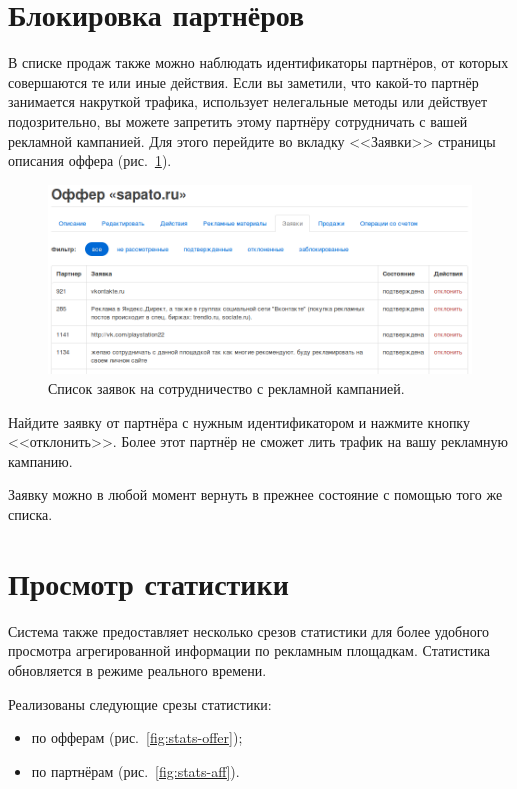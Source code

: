\documentclass[a4paper,12pt]{article}
\begin{document}
\section{Блокировка партнёров}

В списке продаж также можно наблюдать идентификаторы партнёров, от которых совершаются те или иные действия. Если вы заметили, что какой-то партнёр занимается накруткой трафика, использует нелегальные методы или действует подозрительно, вы можете запретить этому партнёру сотрудничать с вашей рекламной кампанией. Для этого перейдите во вкладку <<Заявки>> страницы описания оффера (рис.~\ref{fig:requests}).

\begin{figure}[!ht]
\centering
\includegraphics[width=\textwidth]{include/requests.png}
\caption{Список заявок на сотрудничество с рекламной кампанией.}
\label{fig:requests}
\end{figure}

Найдите заявку от партнёра с нужным идентификатором и нажмите кнопку <<отклонить>>. Более этот партнёр не сможет лить трафик на вашу рекламную кампанию.

Заявку можно в любой момент вернуть в прежнее состояние с помощью того же списка.

\section{Просмотр статистики}

Система \heymoose{} также предоставляет несколько срезов статистики для более удобного просмотра агрегированной информации по рекламным площадкам. Статистика обновляется в режиме реального времени.

Реализованы следующие срезы статистики:

\begin{itemize}
\item по офферам (рис.~\ref{fig:stats-offer});
\item по партнёрам (рис.~\ref{fig:stats-aff}).
\end{itemize}
\end{document}
